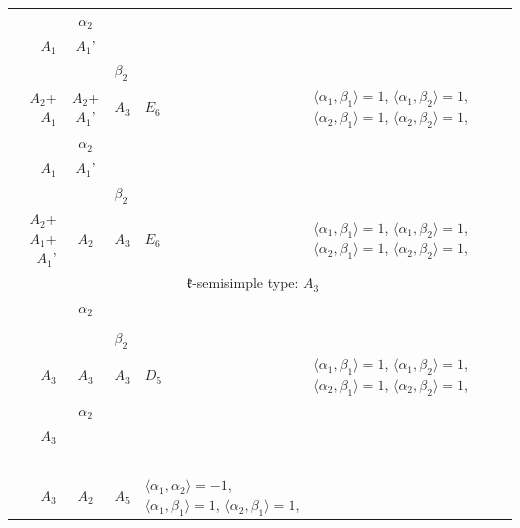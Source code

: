 \documentclass[12pt]{report}
\begin{document}
\begin{appendix}
{\begin{longtable}{rcl p{1cm}p{1cm}p{3cm} }
\\
\begin{tabular}{cc}$\alpha_1$+ & $\alpha_2$\\\tiny{ $A_1$ } & \tiny{ $A_1$' }\end{tabular} &\begin{tabular}{c} = \\~ \end{tabular} & \begin{tabular}{cc}$\beta_1$+ & $\beta_2$\\\tiny{ $A_2$+$A_1$ } & \tiny{ $A_2$+$A_1$' }\end{tabular} & $A_3$ & $E_6$ &  $\langle\alpha_1, \beta_1\rangle=1$, $\langle\alpha_1, \beta_2\rangle=1$, $\langle\alpha_2, \beta_1\rangle=1$, $\langle\alpha_2, \beta_2\rangle=1$, 
\\
\begin{tabular}{cc}$\alpha_1$+ & $\alpha_2$\\\tiny{ $A_1$ } & \tiny{ $A_1$' }\end{tabular} &\begin{tabular}{c} = \\~ \end{tabular} & \begin{tabular}{cc}$\beta_1$+ & $\beta_2$\\\tiny{ $A_2$+$A_1$+$A_1$' } & \tiny{ $A_2$ }\end{tabular} & $A_3$ & $E_6$ &  $\langle\alpha_1, \beta_1\rangle=1$, $\langle\alpha_1, \beta_2\rangle=1$, $\langle\alpha_2, \beta_1\rangle=1$, $\langle\alpha_2, \beta_2\rangle=1$, 
\\
\hline\multicolumn{5}{c}{$\mathfrak{k}$-semisimple type: $A_3$}\\
\hline\hline\begin{tabular}{cc}$\alpha_1$+ & $\alpha_2$\\\tiny{  } & \tiny{  }\end{tabular} &\begin{tabular}{c} = \\~ \end{tabular} & \begin{tabular}{cc}$\beta_1$+ & $\beta_2$\\\tiny{ $A_3$ } & \tiny{ $A_3$ }\end{tabular} & $A_3$ & $D_5$ &  $\langle\alpha_1, \beta_1\rangle=1$, $\langle\alpha_1, \beta_2\rangle=1$, $\langle\alpha_2, \beta_1\rangle=1$, $\langle\alpha_2, \beta_2\rangle=1$, 
\\
\begin{tabular}{cc}$\alpha_1$+ & $\alpha_2$\\\tiny{ $A_3$ } & \tiny{  }\end{tabular} &\begin{tabular}{c} = \\~ \end{tabular} & \begin{tabular}{c}$\beta_1$\\\tiny{ $A_3$ }\end{tabular} & $A_2$ & $A_5$ & $\langle\alpha_1, \alpha_2\rangle=-1$,  $\langle\alpha_1, \beta_1\rangle=1$, $\langle\alpha_2, \beta_1\rangle=1$, 

\end{longtable}}
\end{appendix}
\end{document}
